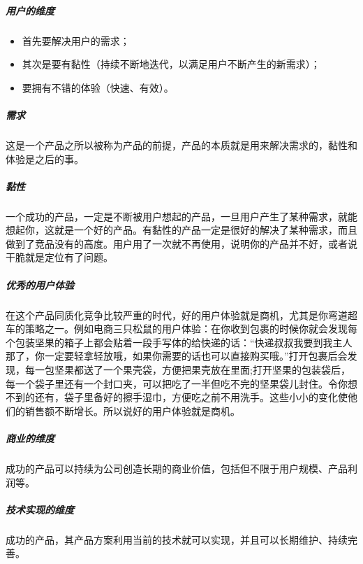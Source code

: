 \documentclass[letterpaper,11pt,english]{sphinxmanual}
\begin{document}
\subparagraph{用户的维度}
\label{\detokenize{chapter_introduction/Product:id4}}\begin{itemize}
\item {} 
首先要解决用户的需求；

\item {} 
其次是要有黏性（持续不断地迭代，以满足用户不断产生的新需求）；

\item {} 
要拥有不错的体验（快速、有效）。

\end{itemize}


\subparagraph{需求}
\label{\detokenize{chapter_introduction/Product:id5}}
这是一个产品之所以被称为产品的前提，产品的本质就是用来解决需求的，黏性和体验是之后的事。


\subparagraph{黏性}
\label{\detokenize{chapter_introduction/Product:id6}}
一个成功的产品，一定是不断被用户想起的产品，一旦用户产生了某种需求，就能想起你，这就是一个好的产品。有黏性的产品一定是很好的解决了某种需求，而且做到了竞品没有的高度。用户用了一次就不再使用，说明你的产品并不好，或者说干脆就是定位有了问题。


\subparagraph{优秀的用户体验}
\label{\detokenize{chapter_introduction/Product:id7}}
在这个产品同质化竞争比较严重的时代，好的用户体验就是商机，尤其是你弯道超车的策略之一。例如电商三只松鼠的用户体验：在你收到包裹的时候你就会发现每个包装坚果的箱子上都会贴着一段手写体的给快递的话：“快递叔叔我要到我主人那了，你一定要轻拿轻放哦，如果你需要的话也可以直接购买哦。”打开包裹后会发现，每一包坚果都送了一个果壳袋，方便把果壳放在里面;打开坚果的包装袋后，每一个袋子里还有一个封口夹，可以把吃了一半但吃不完的坚果袋儿封住。令你想不到的还有，袋子里备好的擦手湿巾，方便吃之前不用洗手。这些小小的变化使他们的销售额不断增长。所以说好的用户体验就是商机。


\subparagraph{商业的维度}
\label{\detokenize{chapter_introduction/Product:id8}}
成功的产品可以持续为公司创造长期的商业价值，包括但不限于用户规模、产品利润等。


\subparagraph{技术实现的维度}
\label{\detokenize{chapter_introduction/Product:id9}}
成功的产品，其产品方案利用当前的技术就可以实现，并且可以长期维护、持续完善。
\end{document}
